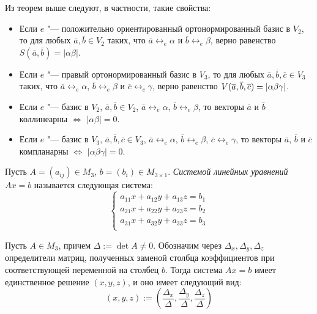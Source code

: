 \begin{note}
	Из теорем выше следуют, в частности, такие свойства:
	\begin{itemize}
		\item Если $e$ "--- положительно ориентированный ортонормированный базис в $V_2$, то для любых $\overline a, \overline b \in V_2$ таких, что $\overline a \leftrightarrow_e \alpha$ и $\overline b \leftrightarrow_e \beta$, верно равенство $S(\overline{a}, \overline{b}) = |\alpha\beta|$.
		\item Если $e$ "--- правый ортонормированный базис в $V_3$, то для любых $\overline a, \overline b, \overline c \in V_3$ таких, что $\overline a \leftrightarrow_e \alpha$, $\overline b \leftrightarrow_e \beta$ и $\overline c \leftrightarrow_e \gamma$, верно равенство $V(\overline{a}, \overline{b}, \overline{c}) \hm{=} |\alpha\beta\gamma|$.
		\item Если $e$ "--- базис в $V_2$, $\overline a, \overline b \in V_2$, $\overline a \leftrightarrow_e \alpha$, $\overline b \leftrightarrow_e \beta$, то векторы $\overline{a}$ и $\overline{b}$ коллинеарны $\Leftrightarrow$ $|\alpha\beta| = 0$.
		\item Если $e$ "--- базис в $V_3$, $\overline a, \overline b, \overline c \in V_3$, $\overline a \leftrightarrow_e \alpha$, $\overline b \leftrightarrow_e \beta$, $\overline c \leftrightarrow_e \gamma$, то векторы $\overline{a}$, $\overline{b}$ и $\overline{c}$ компланарны $\Leftrightarrow$ $|\alpha\beta\gamma| = 0$.
	\end{itemize}
\end{note}

\begin{definition}
	Пусть $A = (a_{ij}) \in M_{3}$, $b = (b_i) \in M_{3 \times 1}$. \textit{Системой линейных уравнений} $Ax = b$ называется следующая система:
	\[
	\left\{
	\begin{aligned}
	a_{11}x + a_{12}y + a_{13}z = b_1\\
	a_{21}x + a_{22}y + a_{23}z = b_2\\
	a_{31}x + a_{32}y + a_{33}z = b_3\\
	\end{aligned}
	\right.
	\]
\end{definition}

\begin{theorem}
	Пусть $A\in M_3$, причем $\Delta := \det A \ne 0$. Обозначим через $\Delta_x, \Delta_y, \Delta_z$ определители матриц, полученных заменой столбца коэффициентов при соответствующей переменной на столбец $b$. Тогда система $Ax = b$ имеет единственное решение $(x, y, z)$, и оно имеет следующий вид:
	\[(x, y, z) := \left(\frac{\Delta_x}{\Delta}, \frac{\Delta_y}{\Delta}, \frac{\Delta_z}{\Delta}\right)\]
\end{theorem}

